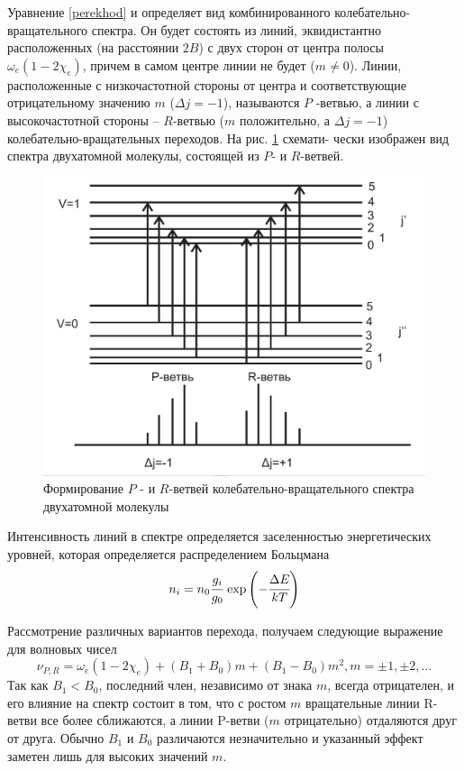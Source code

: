 Уравнение \eqref{perekhod}  и определяет вид комбинированного колебательно-вращательного спектра. Он будет состоять из линий, эквидистантно расположенных (на расстоянии $2B$) с двух сторон от центра полосы
$\omega_e(1-2\chi_e)$, причем в самом центре линии не будет ($m\neq0$). Линии,
расположенные с низкочастотной стороны от центра и соответствующие отрицательному значению $m$ ($\Delta j = -1$), называются $P$ -ветвью, а линии с высокочастотной стороны – $R$-ветвью ($m$ положительно, а $\Delta j = -1$) колебательно-вращательных переходов. На рис. \ref{PR:fig} схемати-
чески изображен вид спектра двухатомной молекулы, состоящей из $P$- и $R$-ветвей.


\begin{figure}[h!]
	\centering
	\includegraphics[width=0.8\linewidth]{PR}
	\caption{Формирование $P$ - и $R$-ветвей колебательно-вращательного спектра двухатомной молекулы}
	\label{PR:fig}
\end{figure}

Интенсивность линий в спектре определяется заселенностью энергетических уровней, которая определяется распределением Больцмана
\begin{equation}
n_i = n_0\cfrac{g_i}{g_0}\,\exp{\left(-\cfrac{\Delta E}{kT}\right)}
\end{equation}

Рассмотрение различных вариантов перехода, получаем следующие выражение для волновых чисел
\begin{equation}
\nu_{P, R} = \omega_e(1-2\chi_e)+(B_1+B_0)m+(B_1-B_0)m^2, m = \pm 1, \pm2, \dots
\end{equation}
Так как $B_1 < B_0$, последний член, независимо от знака
$m$, всегда отрицателен, и его влияние на спектр состоит в том, что
с ростом $m$ вращательные линии R-ветви все более сближаются, а
линии P-ветви ($m$ отрицательно) отдаляются друг от друга. Обычно
$B_1$ и $B_0$ различаются незначительно и указанный эффект заметен лишь
для высоких значений $m$.

